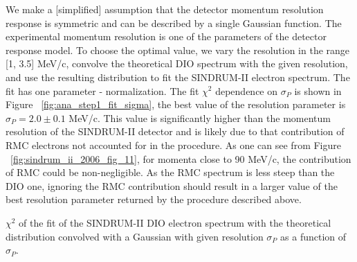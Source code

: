 We make a [simplified] assumption that the detector momentum resolution response
is symmetric and can be described by a single Gaussian function. 
The experimental momentum resolution is one of the parameters of the detector response model.
To choose the optimal value, we vary the resolution in the range [1, 3.5] MeV/c, convolve the
theoretical DIO spectrum with the given resolution, and use the resulting distribution to fit
the SINDRUM-II electron spectrum. The fit has one parameter - normalization. The fit $\chi^2$ dependence
on $\sigma_P$ is shown in Figure ~\ref{fig:ana_step1_fit_sigma}, the best value of the resolution
parameter is $\sigma_P = 2.0 \pm 0.1$ MeV/c. This value is significantly higher than the momentum
resolution of the SINDRUM-II detector and is likely due to that contribution of RMC electrons
not accounted for in the procedure. As one can see from Figure ~\ref{fig:sindrum_ii_2006_fig_11},
for momenta close to 90 MeV/c, the contribution of RMC could be non-negligible. As the RMC spectrum
is less steep than the DIO one, ignoring the RMC contribution should result in a larger value of the
best resolution parameter returned by the procedure described above.

\vspace{0.2in}
%
 {
  \label{fig:ana_step1_fit_sigma}
  $\chi^2$ of the fit of the SINDRUM-II DIO electron spectrum with the theoretical distribution
  convolved with a Gaussian with given resolution $\sigma_P$ as a function of $\sigma_P$.
}
\vspace{0.2in}

